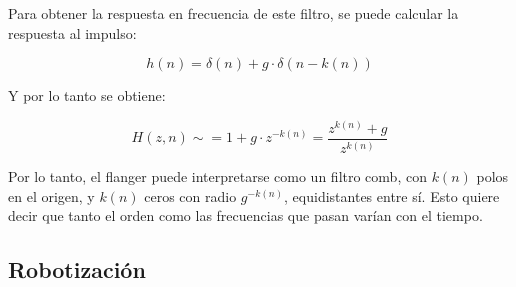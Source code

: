 \documentclass[assd_tp2_main.tex]{subfiles}
\begin{document}
Para obtener la respuesta en frecuencia de este filtro, se puede calcular la respuesta al impulso:

\[
	h(n) = \delta (n) + g \cdot \delta (n-k(n))
\]

Y por lo tanto se obtiene:

\[
	H(z, n) \sim = 1 + g\cdot z^{-k(n)} = \frac{z^{k(n)} + g}{z^{k(n)}}
\]

Por lo tanto, el flanger puede interpretarse como un filtro comb, con $k(n)$ polos en el origen, y $k(n)$ ceros con radio $g^{-k(n)}$, equidistantes entre s\'i. Esto quiere decir que tanto el orden como las frecuencias que pasan var\'ian con el tiempo.



\subsection{Robotizaci\'on}
\end{document}
